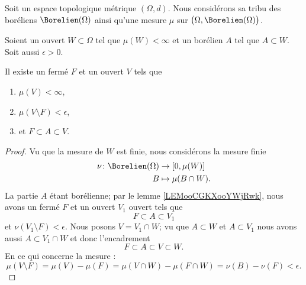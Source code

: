 \begin{lemma}       \label{LEMooZDFVooFUgFGZ}
	Soit un espace topologique métrique \( (\Omega,d)\). Nous considérons sa tribu des boréliens \( \Borelien(\Omega)\) ainsi qu'une mesure \( \mu\) sur \( \big(\Omega,\Borelien(\Omega)\big)\).

	Soient un ouvert \( W\subset \Omega\) tel que \( \mu(W)<\infty\) et un borélien \( A\) tel que \( A\subset W\). Soit aussi \( \epsilon>0\).

	Il existe un fermé \( F\) et un ouvert \( V\) tels que
	\begin{enumerate}
		\item \( \mu(V)<\infty\),
		\item
		      \( \mu(V\setminus F)<\epsilon\),
		\item et \( F\subset A\subset V\).
	\end{enumerate}
\end{lemma}

\begin{proof}
	Vu que la mesure de \( W\) est finie, nous considérons la mesure finie
	\begin{equation}
		\begin{aligned}
			\nu\colon \Borelien(\Omega) & \to \mathopen[ 0 , \mu(W) \mathclose] \\
			B                           & \mapsto \mu(B\cap W).
		\end{aligned}
	\end{equation}
	La partie \( A\) étant borélienne; par le lemme \ref{LEMooCGKXooYWjRwk}, nous avons un fermé \( F\) et un ouvert \( V_1\) ouvert tels que
	\begin{equation}
		F\subset A\subset V_1
	\end{equation}
	et \( \nu(V_1\setminus F)<\epsilon\). Nous posons \( V=V_1\cap W\); vu que \( A\subset W\) et \( A\subset V_1\) nous avons aussi \( A\subset V_1\cap  W\) et donc l'encadrement
	\begin{equation}
		F\subset A\subset V\subset W.
	\end{equation}
	En ce qui concerne la mesure :
	\begin{equation}
		\mu(V\setminus F)=\mu(V)-\mu(F)=\mu(V\cap W)-\mu(F\cap W)=\nu(B)-\nu(F)<\epsilon.
	\end{equation}
\end{proof}

